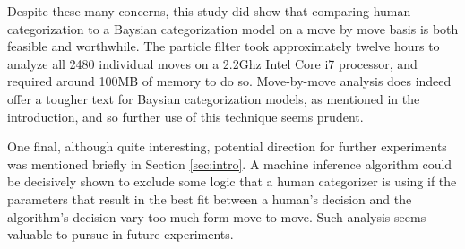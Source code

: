 Despite these many concerns, this study did show that comparing human
categorization to a Baysian categorization model on a move by move basis is both
feasible and worthwhile.  The particle filter took approximately twelve hours to
analyze all 2480 individual moves on a 2.2Ghz Intel Core i7 processor, and
required around 100MB of memory to do so. Move-by-move analysis does indeed
offer a tougher text for Baysian categorization models, as mentioned in the
introduction, and so further use of this technique seems prudent.

One final, although quite interesting, potential direction for further
experiments was mentioned briefly in Section \ref{sec:intro}. A machine inference
algorithm could be decisively shown to exclude some logic that a human
categorizer is using if the parameters that result in the best fit between a
human's decision and the algorithm's decision vary too much form move to move.
Such analysis seems valuable to pursue in future experiments.
